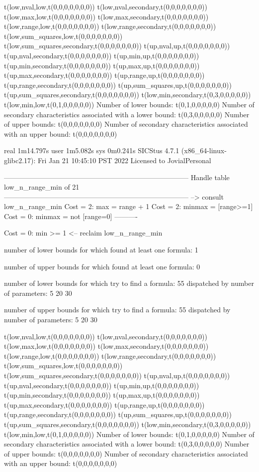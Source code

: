 t(low,nval,low,t(0,0,0,0,0,0,0))
t(low,nval,secondary,t(0,0,0,0,0,0,0))
t(low,max,low,t(0,0,0,0,0,0,0))
t(low,max,secondary,t(0,0,0,0,0,0,0))
t(low,range,low,t(0,0,0,0,0,0,0))
t(low,range,secondary,t(0,0,0,0,0,0,0))
t(low,sum_squares,low,t(0,0,0,0,0,0,0))
t(low,sum_squares,secondary,t(0,0,0,0,0,0,0))
t(up,nval,up,t(0,0,0,0,0,0,0))
t(up,nval,secondary,t(0,0,0,0,0,0,0))
t(up,min,up,t(0,0,0,0,0,0,0))
t(up,min,secondary,t(0,0,0,0,0,0,0))
t(up,max,up,t(0,0,0,0,0,0,0))
t(up,max,secondary,t(0,0,0,0,0,0,0))
t(up,range,up,t(0,0,0,0,0,0,0))
t(up,range,secondary,t(0,0,0,0,0,0,0))
t(up,sum_squares,up,t(0,0,0,0,0,0,0))
t(up,sum_squares,secondary,t(0,0,0,0,0,0,0))
t(low,min,secondary,t(0,3,0,0,0,0,0))
t(low,min,low,t(0,1,0,0,0,0,0))
Number of lower bounds:                                             t(0,1,0,0,0,0,0)
Number of secondary characteristics associated with a lower bound:  t(0,3,0,0,0,0,0)
Number of upper bounds:                                             t(0,0,0,0,0,0,0)
Number of secondary characteristics associated with an upper bound: t(0,0,0,0,0,0,0)

real	1m14.797s
user	1m5.082s
sys	0m0.241s
SICStus 4.7.1 (x86_64-linux-glibc2.17): Fri Jan 21 10:45:10 PST 2022
Licensed to JovialPersonal


--------------------------------------------------------------------------------
Handle table low_n_range_min of 21
--------------------------------------------------------------------------------
--> consult low_n_range_min
Cost =  2:  max    = range + 1
Cost =  2:  minmax = [range>=1]
Cost =  0:  minmax = not [range=0]
----------

Cost =  0:  min >= 1
<-- reclaim low_n_range_min

number of lower bounds for which found at least one formula: 1

number of upper bounds for which found at least one formula: 0

number of lower bounds for which try to find a formula: 55
dispatched by number of parameters: 5  20  30

number of upper bounds for which try to find a formula: 55
dispatched by number of parameters: 5  20  30

t(low,nval,low,t(0,0,0,0,0,0,0))
t(low,nval,secondary,t(0,0,0,0,0,0,0))
t(low,max,low,t(0,0,0,0,0,0,0))
t(low,max,secondary,t(0,0,0,0,0,0,0))
t(low,range,low,t(0,0,0,0,0,0,0))
t(low,range,secondary,t(0,0,0,0,0,0,0))
t(low,sum_squares,low,t(0,0,0,0,0,0,0))
t(low,sum_squares,secondary,t(0,0,0,0,0,0,0))
t(up,nval,up,t(0,0,0,0,0,0,0))
t(up,nval,secondary,t(0,0,0,0,0,0,0))
t(up,min,up,t(0,0,0,0,0,0,0))
t(up,min,secondary,t(0,0,0,0,0,0,0))
t(up,max,up,t(0,0,0,0,0,0,0))
t(up,max,secondary,t(0,0,0,0,0,0,0))
t(up,range,up,t(0,0,0,0,0,0,0))
t(up,range,secondary,t(0,0,0,0,0,0,0))
t(up,sum_squares,up,t(0,0,0,0,0,0,0))
t(up,sum_squares,secondary,t(0,0,0,0,0,0,0))
t(low,min,secondary,t(0,3,0,0,0,0,0))
t(low,min,low,t(0,1,0,0,0,0,0))
Number of lower bounds:                                             t(0,1,0,0,0,0,0)
Number of secondary characteristics associated with a lower bound:  t(0,3,0,0,0,0,0)
Number of upper bounds:                                             t(0,0,0,0,0,0,0)
Number of secondary characteristics associated with an upper bound: t(0,0,0,0,0,0,0)

